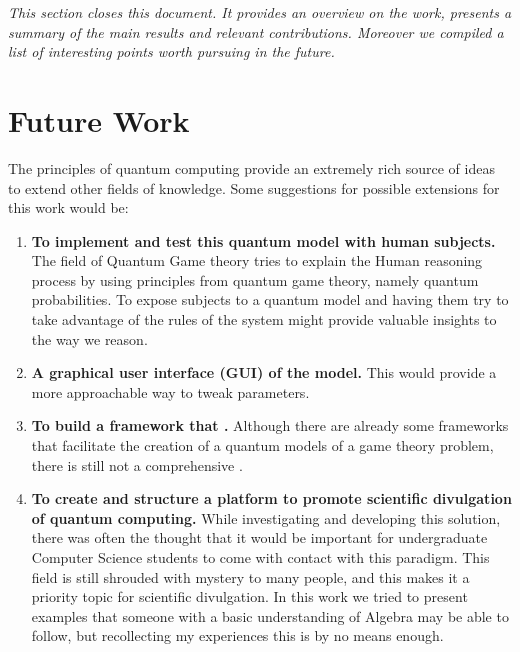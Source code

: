 \label{cap:conclusions}

\textit{This section closes this document. It provides an overview on the work, presents a summary of the main results and relevant contributions. Moreover we compiled a list of interesting points worth pursuing in the future.}


\section{Future Work}
\label{sec:5FutureWork}

The principles of quantum computing provide an extremely rich source of ideas to extend other fields of knowledge.
Some suggestions for possible extensions for this work would be:

\begin{enumerate}
\item \textbf{To implement and test this quantum model with human subjects.} The field of Quantum Game theory tries to explain the Human reasoning process by using principles from quantum game theory, namely quantum probabilities. To expose subjects to a quantum model and having them try to take advantage of the rules of the system might provide valuable insights to the way we reason. 
\item \textbf{A graphical user interface (GUI) of the model.} This would provide a more approachable way to tweak parameters.
\item \textbf{To build a framework that .} Although there are already some frameworks that facilitate the creation of a quantum models of a game theory problem, there is still not a comprehensive .
\item \textbf{To create and structure a platform to promote scientific divulgation of quantum computing.} While investigating and developing this solution, there was often the thought that it would be important for undergraduate Computer Science students to come with contact with this paradigm. This field is still shrouded with mystery to many people, and this makes it a priority topic for scientific divulgation. In this work we tried to present examples that someone with a basic understanding of Algebra may be able to follow, but recollecting my experiences this is by no means enough.
\end{enumerate}

\cleardoublepage
